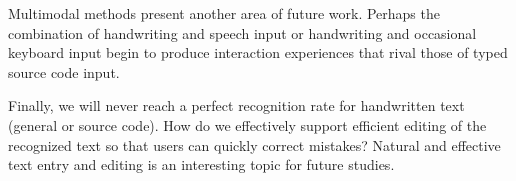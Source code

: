 \documentclass{vgtc}                          %
\begin{document}


Multimodal methods present another area of future work.  Perhaps the combination of handwriting and speech input or handwriting and occasional keyboard input \cite{mueller2014pen} begin to produce interaction experiences that rival those of typed source code input.  

Finally, we will never reach a perfect recognition rate for handwritten text (general or source code).  How do we effectively support efficient editing of the recognized text so that users can quickly correct mistakes? Natural and effective text entry and editing is an interesting topic for future studies.








%

%
%
%


\end{document}
